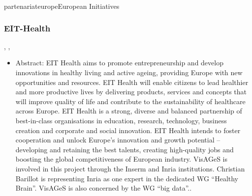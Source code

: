 \documentclass{ra2018}
\begin{document}
\begin{module}{partenariat}{europe}{European Initiatives}
\subsubsection{EIT-Health}
\begin{participants}    	
	, 	
	,
\end{participants}  
  \begin{itemize}
        \item Abstract:  EIT Health aims to promote entrepreneurship and develop innovations in healthy living and active ageing, providing Europe with new opportunities and resources. EIT Health will enable citizens to lead healthier and more productive lives by delivering products, services and concepts that will improve quality of life and contribute to the sustainability of healthcare across Europe. EIT Health is a strong, diverse and balanced partnership of best-in-class organisations in education, research, technology, business creation and corporate and social innovation. EIT Health intends to foster cooperation and unlock Europe’s innovation and growth potential – developing and retaining the best talents, creating high-quality jobs and boosting the global competitiveness of European industry. VisAGeS is involved in this project through the Inserm and Inria institutions. Christian Barillot is representing Inria as one expert in the dedicated WG “Healthy Brain”. VisAGeS is also concerned by the WG “big data”..
\end{itemize}  





\end{module}
\end{document}
